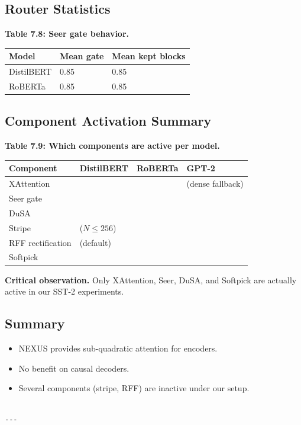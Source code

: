 \subsection{Router Statistics}

\textbf{Table 7.8: Seer gate behavior.}

\begin{table}[H]
\centering
\small
\begin{tabular}{lll}
\toprule
\textbf{Model} & \textbf{Mean gate} & \textbf{Mean kept blocks} \\
\midrule
DistilBERT & 0.85 & 0.85 \\
RoBERTa & 0.85 & 0.85 \\
\bottomrule
\end{tabular}
\end{table}

\subsection{Component Activation Summary}

\textbf{Table 7.9: Which components are active per model.}

\begin{table}[H]
\centering
\small
\begin{tabular}{llll}
\toprule
\textbf{Component} & \textbf{DistilBERT} & \textbf{RoBERTa} & \textbf{GPT-2} \\
\midrule
XAttention &  &  & (dense fallback) \\
Seer gate &  &  &  \\
DuSA &  &  &  \\
Stripe & ($N \leq 256$) &  &  \\
RFF rectification & (default) &  &  \\
Softpick &  &  &  \\
\bottomrule
\end{tabular}
\end{table}

\textbf{Critical observation.} Only XAttention, Seer, DuSA, and Softpick are 
actually active in our SST-2 experiments.

\subsection{Summary}

\begin{itemize}
\item NEXUS provides sub-quadratic attention for encoders.
\item No benefit on causal decoders.
\item Several components (stripe, RFF) are inactive under our setup.
\end{itemize}
\begin{lstlisting}

---
\end{lstlisting}

